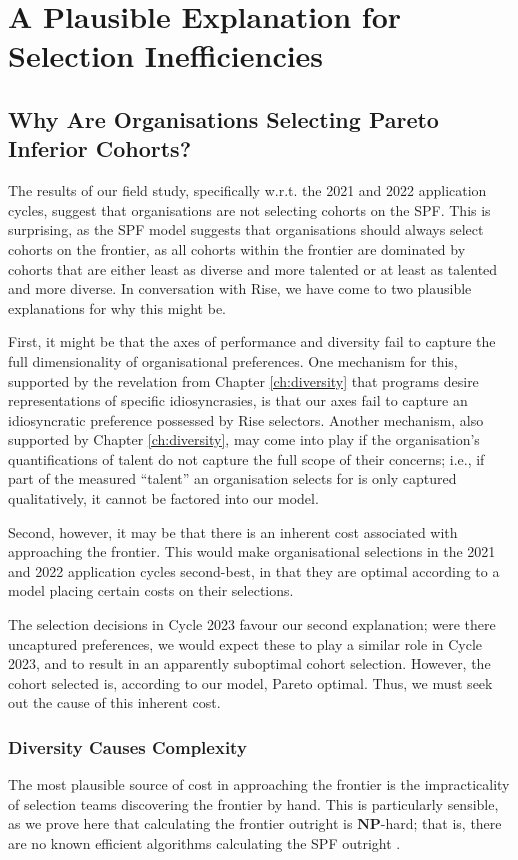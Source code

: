 \section{A Plausible Explanation for Selection Inefficiencies}\label{sec:spfexplanation}
\subsection{Why Are Organisations Selecting Pareto Inferior Cohorts?}\label{subsec:dts_nphard}
The results of our field study, specifically w.r.t. the 2021 and 2022 application cycles, suggest that organisations are not selecting cohorts on the SPF. This is surprising, as the SPF model suggests that organisations should always select cohorts on the frontier, as all cohorts within the frontier are dominated by cohorts that are either least as diverse and more talented or at least as talented and more diverse. In conversation with Rise, we have come to two plausible explanations for why this might be.

First, it might be that the axes of performance and diversity fail to capture the full dimensionality of organisational preferences. One mechanism for this, supported by the revelation from Chapter \ref{ch:diversity} that programs desire representations of specific idiosyncrasies, is that our axes fail to capture an idiosyncratic preference possessed by Rise selectors. Another mechanism, also supported by Chapter \ref{ch:diversity}, may come into play if the organisation's quantifications of talent do not capture the full scope of their concerns; i.e., if part of the measured ``talent'' an organisation selects for is only captured qualitatively, it cannot be factored into our model.

Second, however, it may be that there is an inherent cost associated with approaching the frontier. This would make organisational selections in the 2021 and 2022 application cycles second-best, in that they are optimal according to a model placing certain costs on their selections. 

The selection decisions in Cycle 2023 favour our second explanation; were there uncaptured preferences, we would expect these to play a similar role in Cycle 2023, and to result in an apparently suboptimal cohort selection. However, the cohort selected is, according to our model, Pareto optimal. Thus, we must seek out the cause of this inherent cost.

\subsubsection{Diversity Causes Complexity}\label{subsubsec:nphard}
The most plausible source of cost in approaching the frontier is the impracticality of selection teams discovering the frontier by hand. This is particularly sensible, as we prove here that calculating the frontier outright is $\mathbf{NP}$-hard; that is, there are no known efficient algorithms calculating the SPF outright \cite{COPPERSMITH198527}.

